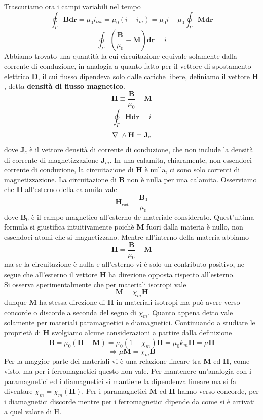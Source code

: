 \documentclass[
10pt, %
a4paper, %
oneside, %
headinclude,footinclude, %
BCOR5mm, %
]{scrartcl}
\begin{document}
Trascuriamo ora i campi variabili nel tempo
\[\oint_\Gamma \mathbf{B}\mathbf{dr} = \mu_0 i_{tot} = \mu_0(i + i_m)=\mu_0 i +\mu_0\oint_\Gamma \mathbf{M}\mathbf{dr}\]
\[\oint_\Gamma\left(\frac{\mathbf{B}}{\mu_0}-\mathbf{M}\right)\mathbf{dr} = i\]
Abbiamo trovato una quantità la cui circuitazione equivale solamente dalla corrente di conduzione, in analogia a quanto fatto per il vettore di spostamento elettrico \(\mathbf{D}\), il cui flusso dipendeva solo dalle cariche libere, definiamo il vettore \(\mathbf{H}\), detta \textbf{densità di flusso magnetico}. 
\[\mathbf{H}\equiv \frac{\mathbf{B}}{\mu_0}- \mathbf{M}\]
\[\oint_\Gamma\mathbf{H}\mathbf{dr} = i\]
\[\nabla\ \wedge\mathbf{H}=\mathbf{J}_c\]
dove \(\mathbf{J}_c\) è il vettore densità di corrente di conduzione, che non include la densità di corrente di magnetizzazione \(\mathbf{J}_m\).
In una calamita, chiaramente, non essendoci corrente di conduzione, la circuitazione di \(\mathbf{H}\) è nulla, ci sono solo correnti di magnetizzazione. La circuitazione di \(\mathbf{B}\) non è nulla per una calamita. Osserviamo che \(\mathbf{H}\) all'esterno della calamita vale
\[\mathbf{H}_{ext} = \frac{\mathbf{B}_0}{\mu_0}\]
dove \(\mathbf{B}_0\) è il campo magnetico all'esterno de materiale considerato. Quest'ultima formula si giustifica intuitivamente poichè \(\mathbf{M}\) fuori dalla materia è nullo, non essendoci atomi che si magnetizzano. Mentre all'interno della materia abbiamo
\[\mathbf{ H }= \frac{\mathbf{B}}{\mu_0}- \mathbf{M}\] 
ma se la circuitazione è nulla e all'esterno vi è solo un contributo positivo, ne segue che all'esterno il vettore \(\mathbf{H}\) ha direzione opposta rispetto all'esterno.\\
Si osserva sperimentalmente che per materiali isotropi vale
\[\mathbf{M} = \chi_m\mathbf{H}\]
dunque \(\mathbf{M}\) ha stessa direzione di \(\mathbf{H}\) in materiali isotropi ma può avere verso concorde o discorde a seconda del segno di \(\chi_m\). Quanto appena detto vale solamente per materiali paramagnetici e diamagnetici. Continuando a studiare le proprietà di \(\mathbf{H}\) svolgiamo alcune considerazioni a partire dalla definizione
\[\mathbf{B} = \mu_0 (\mathbf{H}+\mathbf{M}) = \mu_0 (1 +\chi_m)\mathbf{H} = \mu_0 k_m\mathbf{H}=\mu \mathbf{H}\]
\[\Rightarrow \mu\mathbf{M} = \chi_m \mathbf{B}\]
Per la maggior parte dei materiali vi è una relazione lineare tra \(\mathbf{M}\) ed \(\mathbf{H}\), come visto, ma per i ferromagnetici questo non vale. Per mantenere un'analogia con i paramagnetici ed i diamagnetici si mantiene la dipendenza lineare ma si fa diventare \(\chi_m = \chi_m(\mathbf{H})\). Per i paramagnetici \(\mathbf{M}\) ed \(\mathbf{H}\) hanno verso concorde, per i diamagnetici discorde mentre per i ferromagnetici dipende da come si è arrivati a quel valore di H.
\end{document}

